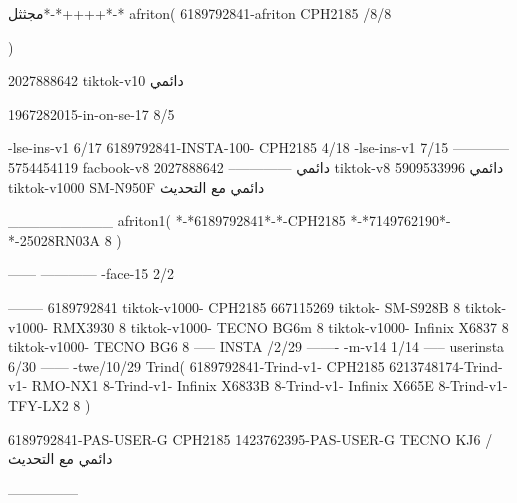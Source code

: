 مجثثل*-*++++*-*
afriton(
6189792841-afriton CPH2185  /8/8

)

2027888642 tiktok-v10
دائمي

1967282015-in-on-se-17 8/5

-lse-ins-v1 6/17
6189792841-INSTA-100- CPH2185 4/18
-lse-ins-v1 7/15
------------
5754454119 facbook-v8
دائمي
--------------
2027888642 tiktok-v8
دائمي
5909533996 tiktok-v1000  SM-N950F
دائمي مع التحديث

__________
afriton1(
*-*6189792841*-*-CPH2185
*-*7149762190*-*-25028RN03A  8
)


------
------------
-face-15 2/2

--------
6189792841 tiktok-v1000- CPH2185 
667115269 tiktok- SM-S928B  8 tiktok-v1000- RMX3930  8 tiktok-v1000- TECNO BG6m  8 tiktok-v1000- Infinix X6837  8 tiktok-v1000- TECNO BG6  8\8
-----
 INSTA /2/29
-------
-m-v14 1/14
-----
userinsta 6/30
------
-twe/10/29
Trind(
6189792841-Trind-v1- CPH2185 
6213748174-Trind-v1-  RMO-NX1  8-Trind-v1-  Infinix X6833B  8-Trind-v1-  Infinix X665E  8-Trind-v1-  TFY-LX2  8\6
)


6189792841-PAS-USER-G CPH2185 
1423762395-PAS-USER-G TECNO KJ6  /دائمي مع التحديث

    ---------------
